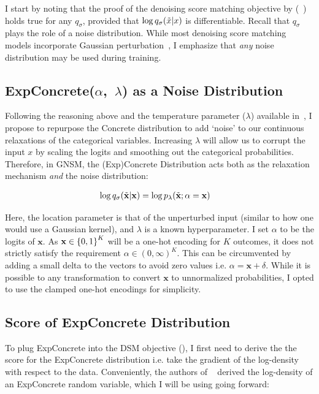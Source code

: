 I start by noting that the proof of the denoising score matching objective by \cite{vincent2011connection} (~) holds true for any $q_\sigma$, provided that $\log q_{\sigma}(\Tilde{x} |x)$ is differentiable.
Recall that $q_\sigma$ plays the role of a noise distribution. While most denoising score matching models incorporate Gaussian perturbation~\cite{Song2019,song2020score,vincent2011connection}, I emphasize that \textit{any} noise distribution may be used during training.

\subsection*{ExpConcrete($\alpha$,~$\lambda$) as a Noise Distribution}
\label{combine}
Following the reasoning above and the temperature parameter ($\lambda$) available in~, I propose to repurpose the Concrete distribution to add `noise' to our continuous relaxations of the categorical variables. Increasing $\lambda$ will allow us to corrupt the input $x$ by scaling the logits and smoothing out the categorical probabilities. Therefore, in GNSM, the (Exp)Concrete Distribution acts both as the relaxation mechanism \textit{and} the noise distribution:

\begin{align*}
     \log q_{\sigma}(\Tilde{\mathbf{x}} | \mathbf{x})  &= \log p_{\lambda}(\Tilde{\mathbf{x}}; \alpha=\mathbf{x})
\end{align*}

Here, the location parameter is that of the unperturbed input (similar to how one would use a Gaussian kernel), and $\lambda$ is a known hyperparameter. I set $\alpha$ to be the logits of $\mathbf{x}$. As $\mathbf{x} \in \left\{ {0,1} \right\}^K$ will be a one-hot encoding for $K$ outcomes, it does not strictly satisfy the requirement $\alpha \in (0, \infty)^K$. This can be circumvented by adding a small delta to the vectors to avoid zero values i.e. $\alpha = \mathbf{x} + \delta $. While it is possible to any transformation to convert $\mathbf{x}$ to unnormalized probabilities, I opted to use the clamped one-hot encodings for simplicity.

\subsection*{Score of ExpConcrete Distribution}

To plug ExpConcrete into the DSM objective (), I first need to derive the the score for the ExpConcrete distribution i.e. take the gradient of the log-density with respect to the data. Conveniently, the authors of ~\cite{maddison2017concrete} derived the log-density of an ExpConcrete random variable, which I will be using going forward:

